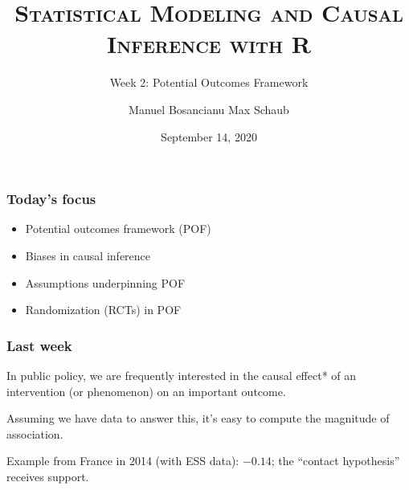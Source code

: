 \documentclass[12pt,english,dvipsnames,aspectratio=169,handout]{beamer}\usepackage[]{graphicx}\usepackage[]{xcolor}
\title{\textsc{Statistical Modeling and Causal Inference with R}}
\subtitle{Week 2: Potential Outcomes Framework}
\date{September 14, 2020}
\author{Manuel Bosancianu \hfill Max Schaub}
\institute{Hertie School of Governance}
\begin{document}
\maketitle



\begin{frame}
	\frametitle{Today's focus}
	
	\begin{itemize}
		\setlength\itemsep{1.5em}
		\item Potential outcomes framework (POF)
		\item Biases in causal inference
		\item Assumptions underpinning POF
		\item Randomization (RCTs) in POF
	\end{itemize}
\end{frame}


\begin{frame}
	\frametitle{Last week}
	
	In public policy, we are frequently interested in the causal effect* of an intervention (or phenomenon) on an important outcome.
	
	\begin{figure}
		\centering
		\scriptsize
	\end{figure}
	\pause
	
	Assuming we have data to answer this, it's easy to compute the magnitude of association.\bigskip
	

	


	Example from France in 2014 (with ESS data): $-0.14$; the ``contact hypothesis'' \cite{allport_nature_1954} receives support.
	
\end{frame}
\end{document}
